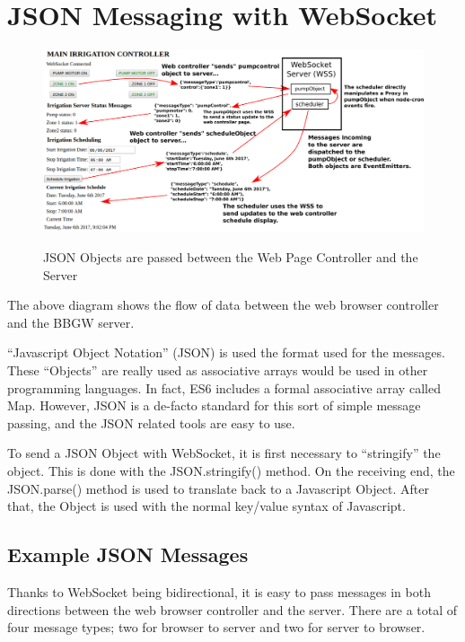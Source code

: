 \chapter{JSON Messaging with WebSocket}

\begin{figure}[h]
	\centering
    \includegraphics[width=1.0\textwidth]{diagrams/websocket_comms}
	\centering\bfseries
	\caption{JSON Objects are passed between the Web Page Controller and the 
	Server}
\end{figure}

The above diagram shows the flow of data between the web browser controller and 
the BBGW server.

``Javascript Object Notation'' (JSON) is used the format used for the 
messages.  These ``Objects'' are really used as associative arrays would be 
used in other programming languages.  In fact, ES6 includes a formal 
associative array called Map.  However, JSON is a de-facto standard for this 
sort of simple message passing, and the JSON related tools are easy to use.

To send a JSON Object with WebSocket, it is first necessary to ``stringify'' 
the object.  This is done with the JSON.stringify() method.  On the receiving 
end, the JSON.parse() method is used to translate back to a Javascript Object.  
After that, the Object is used with the normal key/value syntax of Javascript.

\section{Example JSON Messages}

Thanks to WebSocket being bidirectional, it is easy to pass messages in both 
directions between the web browser controller and the server.  There are a 
total of four message types; two for browser to server and two for server to 
browser.

